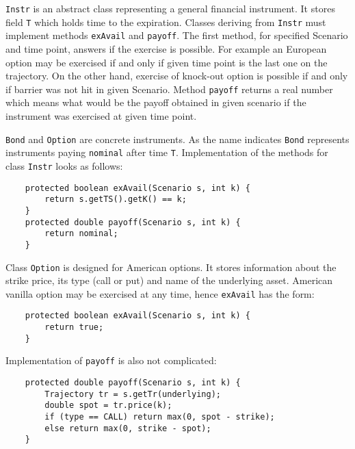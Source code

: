 \documentclass[a4paper,11pt, twoside]{book}
\theoremstyle{definition}
\theoremstyle{remark}
\begin{document}
\texttt{Instr} is an abstract class representing a general financial instrument. It stores field \texttt{T} which holds time to the expiration. Classes deriving from \texttt{Instr} must implement methods \texttt{exAvail} and \texttt{payoff}. The first method, for specified Scenario and time point, answers if the exercise is possible. For example an European option may be exercised if and only if given time point is the last one on the trajectory. On the other hand, exercise of knock-out option is possible if and only if barrier was not hit in given Scenario. Method \texttt{payoff} returns a real number which means what would be the payoff obtained in given scenario if the instrument was exercised at given time point.

\texttt{Bond} and \texttt{Option} are concrete instruments. As the name indicates \texttt{Bond} represents instruments paying \texttt{nominal} after time \texttt{T}. Implementation of the methods for class \texttt{Instr} looks as follows: 
\lstset{language=Java, basicstyle=\small}
\begin{lstlisting}
    protected boolean exAvail(Scenario s, int k) {        
        return s.getTS().getK() == k;
    }
    protected double payoff(Scenario s, int k) {
        return nominal;
    }
\end{lstlisting}

	
Class \texttt{Option} is designed for American options. It stores information about the strike price, its type (call or put) and name of the underlying asset. American vanilla option may be exercised at any time, hence \texttt{exAvail} has the form:
\begin{lstlisting}
    protected boolean exAvail(Scenario s, int k) {
        return true;
    }
\end{lstlisting}
Implementation of \texttt{payoff} is also not complicated:
\begin{lstlisting}
    protected double payoff(Scenario s, int k) {
        Trajectory tr = s.getTr(underlying);
        double spot = tr.price(k);
        if (type == CALL) return max(0, spot - strike);
        else return max(0, strike - spot);
    }
\end{lstlisting}
\end{document}
